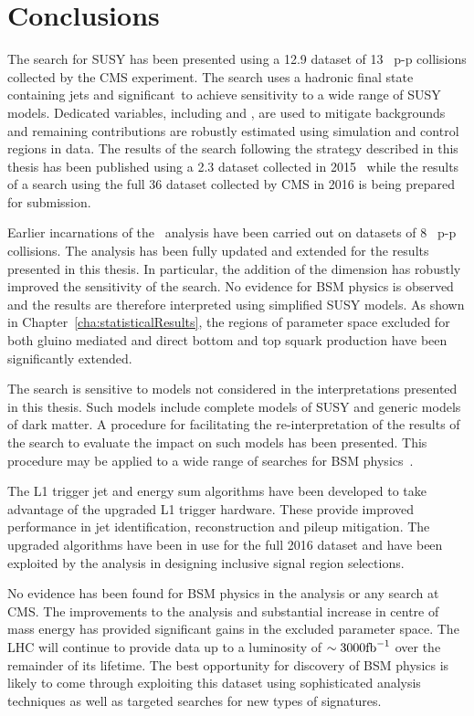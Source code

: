 \chapter{Conclusions}

The \alphat search for SUSY has been presented using a 12.9 \ifb 
dataset of 13 \TeV~p-p collisions collected by the CMS experiment. 
The search uses a hadronic final state containing jets and 
significant~\met to achieve sensitivity to a wide range of SUSY
models. Dedicated variables, including \alphat and \bdphi, are used 
to mitigate backgrounds and remaining contributions
are robustly estimated using simulation and control regions in data.
The results of the \alphat search following the strategy
described in this thesis has been published using 
a 2.3 \ifb dataset collected in 2015~\cite{alphat2015} while the results 
of a search using the full 36 \ifb dataset collected by CMS in 2016 
is being prepared for submission.

Earlier incarnations of the \alphat~analysis have been carried out
on datasets of 8 \TeV~p-p collisions. The analysis has been
fully updated and extended for the results presented in this thesis. 
In particular, the addition of the \mht dimension has robustly improved the sensitivity of the search. 
No evidence for BSM physics is observed and the results are 
therefore interpreted using simplified SUSY models. As shown in Chapter~\ref{cha:statisticalResults},
the regions of parameter space excluded for both gluino mediated 
and direct bottom and top squark production have been 
significantly extended.

The \alphat search is sensitive to models not considered in the
interpretations presented in this thesis. Such models include 
complete models of SUSY and generic models of dark matter. 
A procedure for facilitating the re-interpretation of the results of the search to evaluate the 
impact on such models has been presented. This procedure 
may be applied to a wide range of searches for BSM physics~\cite{simp-lik}.

The L1 trigger jet and energy sum algorithms have been
developed to take advantage of the upgraded L1 trigger hardware.
These provide improved performance in jet identification, 
reconstruction and pileup mitigation. The upgraded algorithms have
been in use for the full 2016 dataset and have been exploited
by the \alphat analysis in designing inclusive signal region selections.

No evidence has been found for BSM physics in the \alphat analysis 
or any search at CMS. The improvements to the analysis and substantial
increase in centre of mass energy has provided significant gains in
the excluded parameter space. The LHC will continue 
to provide data up to a luminosity of $\sim 3000 \text{fb}^{-1}$ over the 
remainder of its lifetime. The best opportunity for discovery of 
BSM physics is likely to come through exploiting this dataset 
using sophisticated analysis techniques as well as targeted searches 
for new types of signatures.


